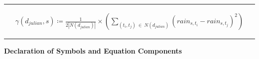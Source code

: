 \documentclass[
  12pt,
]{article}
\begin{document}
\vspace{20pt}

\rule{1\linewidth}{0.5pt}

\begin{equation}\label{eq: empirical_temporal_semivariogram_equation}
\begin{aligned}
\gamma(d_{julian},s) \coloneqq \frac{1}{2|N(d_{julian})|}\times\left(\sum_{(t_i,t_j)\:\in\:N(d_{julian})}\left(rain_{s,t_i} - rain_{s,t_j}\right)^2\right)
\end{aligned}
\end{equation}

\citet{Cressie.2011} \textbar{} \citet{Wikle.2019} \textbar{}
\citet{Auer.2020}

\rule{1\linewidth}{0.5pt}

\begin{center}
\textbf{Declaration of Symbols and Equation Components}
\end{center}
\end{document}

